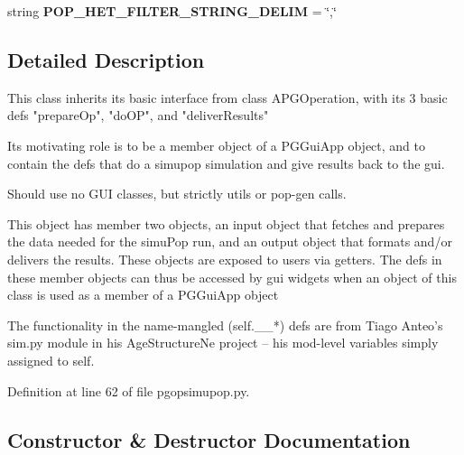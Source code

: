 \begin{DoxyCompactItemize}
\item 
string {\bfseries P\+O\+P\+\_\+\+H\+E\+T\+\_\+\+F\+I\+L\+T\+E\+R\+\_\+\+S\+T\+R\+I\+N\+G\+\_\+\+D\+E\+L\+IM} = \char`\"{},\char`\"{}\hypertarget{classnegui_1_1pgopsimupop_1_1PGOpSimuPop_a28b256f70cbc357e850cb378d4b8a789}{}\label{classnegui_1_1pgopsimupop_1_1PGOpSimuPop_a28b256f70cbc357e850cb378d4b8a789}

\end{DoxyCompactItemize}


\subsection{Detailed Description}
\begin{DoxyVerb}This class inherits its basic interface from class APGOperation, with its 3
basic defs "prepareOp", "doOP", and "deliverResults"

Its motivating role is to be a member object of a PGGuiApp object, and to contain the
defs that do a simupop simulation and give results back to the gui.

Should use no GUI classes, but strictly utils or pop-gen calls.

This object has member two objects, an input object that fetches and prepares the
data needed for the simuPop run, and an output object that formats and/or delivers
the results.   These objects are exposed to users via getters.  The defs in these 
member objects can thus be accessed by gui widgets when an object of this class  
is used as a member of a PGGuiApp object

The functionality in the name-mangled (self.__*) defs are from Tiago Anteo's sim.py module in 
his AgeStructureNe project -- his mod-level variables simply assigned to self.
\end{DoxyVerb}
 

Definition at line 62 of file pgopsimupop.\+py.



\subsection{Constructor \& Destructor Documentation}
